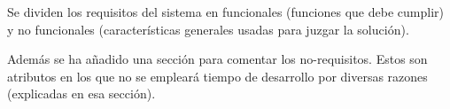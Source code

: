 Se dividen los requisitos del sistema en funcionales (funciones que debe cumplir) y no funcionales (características generales usadas para juzgar la solución).

Además se ha añadido una sección para comentar los no-requisitos. Estos son atributos en los que no se empleará tiempo de desarrollo por diversas razones (explicadas en esa sección).
